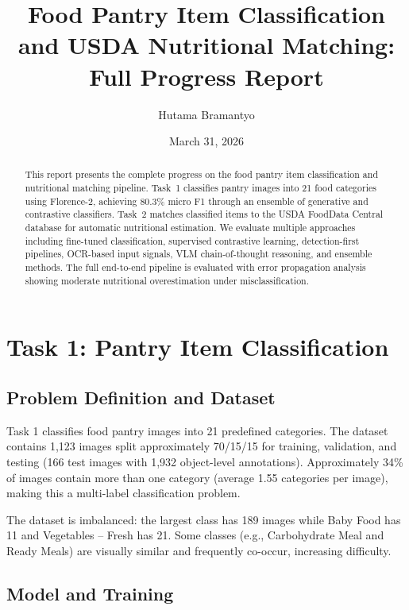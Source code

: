 \documentclass[11pt]{article}
\title{Food Pantry Item Classification and USDA Nutritional Matching:\\Full Progress Report}
\author{Hutama Bramantyo}
\date{March 31, 2026}
\begin{document}
\maketitle

\begin{abstract}
This report presents the complete progress on the food pantry item classification and nutritional matching pipeline. Task~1 classifies pantry images into 21 food categories using Florence-2, achieving 80.3\% micro F1 through an ensemble of generative and contrastive classifiers. Task~2 matches classified items to the USDA FoodData Central database for automatic nutritional estimation. We evaluate multiple approaches including fine-tuned classification, supervised contrastive learning, detection-first pipelines, OCR-based input signals, VLM chain-of-thought reasoning, and ensemble methods. The full end-to-end pipeline is evaluated with error propagation analysis showing moderate nutritional overestimation under misclassification.
\end{abstract}

\tableofcontents
\newpage

\section{Task 1: Pantry Item Classification}
\label{sec:task1}

\subsection{Problem Definition and Dataset}

Task 1 classifies food pantry images into 21 predefined categories. The dataset contains 1,123 images split approximately 70/15/15 for training, validation, and testing (166 test images with 1,932 object-level annotations). Approximately 34\% of images contain more than one category (average 1.55 categories per image), making this a multi-label classification problem.

The dataset is imbalanced: the largest class has 189 images while Baby Food has 11 and Vegetables -- Fresh has 21. Some classes (e.g., Carbohydrate Meal and Ready Meals) are visually similar and frequently co-occur, increasing difficulty.

\subsection{Model and Training}
\end{document}
